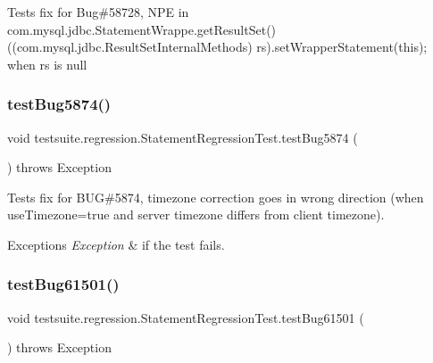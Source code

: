 Tests fix for Bug\#58728, N\+PE in com.\+mysql.\+jdbc.\+Statement\+Wrappe.\+get\+Result\+Set() ((com.\+mysql.\+jdbc.\+Result\+Set\+Internal\+Methods) rs).set\+Wrapper\+Statement(this); when rs is null \mbox{\label{classtestsuite_1_1regression_1_1_statement_regression_test_add450cdadfb025367a53db78024a96e6}} 
\subsubsection{\texorpdfstring{test\+Bug5874()}{testBug5874()}}
{\footnotesize\ttfamily void testsuite.\+regression.\+Statement\+Regression\+Test.\+test\+Bug5874 (\begin{DoxyParamCaption}{ }\end{DoxyParamCaption}) throws Exception}

Tests fix for B\+UG\#5874, timezone correction goes in wrong \textquotesingle{}direction\textquotesingle{} (when use\+Timezone=true and server timezone differs from client timezone).


\begin{DoxyExceptions}{Exceptions}
{\em Exception} & if the test fails. \\
\hline
\end{DoxyExceptions}
\mbox{\label{classtestsuite_1_1regression_1_1_statement_regression_test_a9a35d52eb464cf7089e61c04944d9c4d}} 
\subsubsection{\texorpdfstring{test\+Bug61501()}{testBug61501()}}
{\footnotesize\ttfamily void testsuite.\+regression.\+Statement\+Regression\+Test.\+test\+Bug61501 (\begin{DoxyParamCaption}{ }\end{DoxyParamCaption}) throws Exception}

